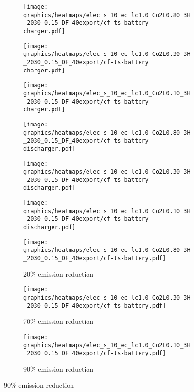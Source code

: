 \clearpage
\onecolumn
\begin{figure}
    \centering
        \begin{subfigure}[t]{0.33\textwidth}
            \centering
        \texttt{[image: graphics/heatmaps/elec\_s\_10\_ec\_lc1.0\_Co2L0.80\_3H\_2030\_0.15\_DF\_40export/cf-ts-battery charger.pdf]}
    \end{subfigure}
    \begin{subfigure}[t]{0.33\textwidth}
        \centering
        \texttt{[image: graphics/heatmaps/elec\_s\_10\_ec\_lc1.0\_Co2L0.30\_3H\_2030\_0.15\_DF\_40export/cf-ts-battery charger.pdf]}
    \end{subfigure}
    \begin{subfigure}[t]{0.33\textwidth}
        \centering
        \texttt{[image: graphics/heatmaps/elec\_s\_10\_ec\_lc1.0\_Co2L0.10\_3H\_2030\_0.15\_DF\_40export/cf-ts-battery charger.pdf]}
    \end{subfigure}


    \begin{subfigure}[t]{0.33\textwidth}
        \centering
        \texttt{[image: graphics/heatmaps/elec\_s\_10\_ec\_lc1.0\_Co2L0.80\_3H\_2030\_0.15\_DF\_40export/cf-ts-battery discharger.pdf]}
    \end{subfigure}
    \begin{subfigure}[t]{0.33\textwidth}
        \centering
        \texttt{[image: graphics/heatmaps/elec\_s\_10\_ec\_lc1.0\_Co2L0.30\_3H\_2030\_0.15\_DF\_40export/cf-ts-battery discharger.pdf]}
    \end{subfigure}
    \begin{subfigure}[t]{0.33\textwidth}
        \centering
        \texttt{[image: graphics/heatmaps/elec\_s\_10\_ec\_lc1.0\_Co2L0.10\_3H\_2030\_0.15\_DF\_40export/cf-ts-battery discharger.pdf]}
        
    \end{subfigure}


    \begin{subfigure}[t]{0.33\textwidth}
        \centering
        \texttt{[image: graphics/heatmaps/elec\_s\_10\_ec\_lc1.0\_Co2L0.80\_3H\_2030\_0.15\_DF\_40export/cf-ts-battery.pdf]}
        \caption{20\% emission reduction}
        \label{fig:operation20}
    \end{subfigure}
    \begin{subfigure}[t]{0.33\textwidth}
        \centering
        \texttt{[image: graphics/heatmaps/elec\_s\_10\_ec\_lc1.0\_Co2L0.30\_3H\_2030\_0.15\_DF\_40export/cf-ts-battery.pdf]}
        \caption{70\% emission reduction}
        \label{fig:operation70}
    \end{subfigure}
    \begin{subfigure}[t]{0.33\textwidth}
        \centering
        \texttt{[image: graphics/heatmaps/elec\_s\_10\_ec\_lc1.0\_Co2L0.10\_3H\_2030\_0.15\_DF\_40export/cf-ts-battery.pdf]}
        \caption{90\% emission reduction}
        \label{fig:operation90}
    \end{subfigure}


\end{figure}
